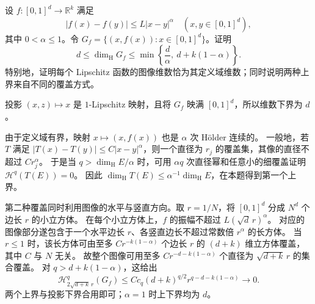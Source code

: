 \begin{optionalexercise}\label{b1:ex:15-holder-graphs}
设 \(f:[0,1]^d\to\mathbb R^k\) 满足
\[
 |f(x)-f(y)|\le L|x-y|^\alpha
 \quad(x,y\in[0,1]^d),
\]
其中 \(0<\alpha\le1\)。令 \(G_f=\{(x,f(x)):x\in[0,1]^d\}\)。证明
\[
 d\le\dim_{\mathrm H}G_f
 \le\min\left\{\frac d\alpha,\ d+k(1-\alpha)\right\}.
\]
特别地，证明每个 Lipschitz 函数的图像维数恰为其定义域维数；同时说明两种上界来自不同的覆盖方式。
\end{optionalexercise}
\begin{solution}
投影 \((x,z)\mapsto x\) 是 \(1\)-Lipschitz 映射，且将 \(G_f\) 映满 \([0,1]^d\)，所以维数下界为 \(d\)。

由于定义域有界，映射 \(x\mapsto(x,f(x))\) 也是 \(\alpha\) 次 Hölder 连续的。
一般地，若 \(T\) 满足 \(|T(x)-T(y)|\le C|x-y|^\alpha\)，则一个直径为 \(r_j\) 的覆盖集，其像的直径不超过 \(Cr_j^\alpha\)。
于是当 \(q>\dim_{\mathrm H}E/\alpha\) 时，可用 \(\alpha q\) 次直径幂和任意小的细覆盖证明 \(\mathcal H^q(T(E))=0\)。
因此 \(\dim_{\mathrm H}T(E)\le\alpha^{-1}\dim_{\mathrm H}E\)，在本题得到第一个上界。

第二种覆盖同时利用图像的水平与竖直方向。取 \(r=1/N\)，将 \([0,1]^d\) 分成 \(N^d\) 个边长 \(r\) 的小立方体。
在每个小立方体上，\(f\) 的振幅不超过 \(L(\sqrt d\,r)^\alpha\)。
对应的图像部分遂包含于一个水平边长 \(r\)、各竖直边长不超过常数倍 \(r^\alpha\) 的长方体。
当 \(r\le1\) 时，该长方体可由至多 \(C r^{-k(1-\alpha)}\) 个边长 \(r\) 的 \((d+k)\) 维立方体覆盖，其中 \(C\) 与 \(N\) 无关。
故整个图像可用至多 \(C r^{-d-k(1-\alpha)}\) 个直径为 \(\sqrt{d+k}\,r\) 的集合覆盖。
对 \(q>d+k(1-\alpha)\)，这给出
\[
 \mathcal H^q_{2\sqrt{d+k}\,r}(G_f)
 \le Cc_q(d+k)^{q/2}r^{q-d-k(1-\alpha)}\longrightarrow0.
\]
两个上界与投影下界合用即可；\(\alpha=1\) 时上下界均为 \(d\)。
\end{solution}

